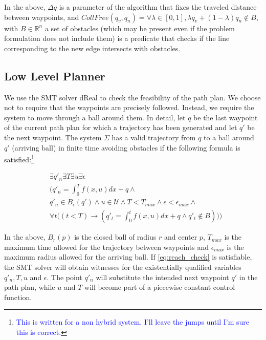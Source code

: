 \documentclass[12pt]{article}
\newcommand\fran[1]{\textcolor{blue}{#1}}
\newcommand\ffran[1]{\textcolor{blue}{\footnote{\fran{#1}}}}
\begin{document}
In the above, $\Delta q$ is a parameter of the algorithm that fixes the traveled distance between waypoints, and $CollFree(q_v, q_n) = \forall \lambda \in [0, 1], \lambda q_v + (1 - \lambda) q_n \notin B$, with $B \in \mathbb{R}^n$ a set of obstacles (which may be present even if the problem formulation does not include them) is a predicate that checks if the line corresponding to the new edge intersects with obstacles.

\subsection{Low Level Planner}
\label{sub:low_level_planner}

We use the SMT solver dReal to check the feasibility of the path plan. We choose not to require that the waypoints are precisely followed. Instead, we require the system to move through a ball around them. In detail, let $q$ be the last waypoint of the current path plan for which a trajectory has been generated and let $q'$ be the next waypoint. The system $\Sigma$ has a valid trajectory from $q$ to a ball around $q'$ (arriving ball) in finite time avoiding obstacles if the following formula is satisfied:\ffran{This is written for a non hybrid system. I'll leave the jumps until I'm sure this is correct.}

\begin{equation}
    \label{eq:reach_check}
    \begin{split}
        &\exists q'_n \exists T \exists u \exists \epsilon \\
        &\bigg(
            q'_n = \int_{0}^{T} f(x, u) dx + q \land \\
        &q'_n \in B_{\epsilon}(q') \land 
            u \in \mathcal{U} \land
            T < T_{max} \land
            \epsilon < \epsilon_{max} \land \\
        &\forall t \Big((t < T) \rightarrow 
            (q'_t = \int_{0}^{t} f(x, u) dx + q \land 
            q'_t \notin B )\Big)
        \bigg)
    \end{split}
\end{equation}

In the above, $B_r(p)$ is the closed ball of radius $r$ and center $p$, $T_{max}$ is the maximum time allowed for the trajectory between waypoints and $\epsilon_{max}$ is the maximum radius allowed for the arriving ball. If \ref{eq:reach_check} is satisfiable, the SMT solver will obtain witnesses for the existentially qualified variables $q'_n, T, u$ and $\epsilon$. The point $q'_n$ will substitute the intended next waypoint $q'$ in the path plan, while $u$ and $T$ will become part of a piecewise constant control function.
\end{document}
